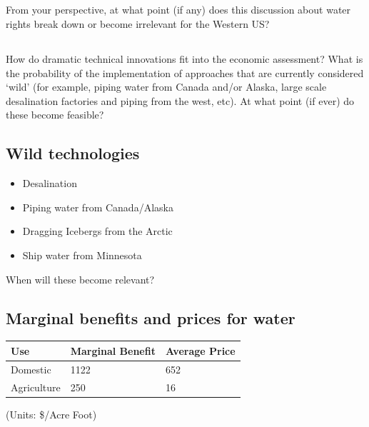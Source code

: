 \documentclass[]{article}
\providecommand{\tightlist}{%
  \setlength{\itemsep}{0pt}\setlength{\parskip}{0pt}}
\begin{document}
\hypertarget{section-38}{%
\subsection{}\label{section-38}}

From your perspective, at what point (if any) does this discussion about
water rights break down or become irrelevant for the Western US?

\hypertarget{section-39}{%
\subsection{}\label{section-39}}

How do dramatic technical innovations fit into the economic assessment?
What is the probability of the implementation of approaches that are
currently considered `wild' (for example, piping water from Canada
and/or Alaska, large scale desalination factories and piping from the
west, etc). At what point (if ever) do these become feasible?

\hypertarget{wild-technologies}{%
\subsection{Wild technologies}\label{wild-technologies}}

\begin{itemize}
\tightlist
\item
  Desalination
\item
  Piping water from Canada/Alaska
\item
  Dragging Icebergs from the Arctic
\item
  Ship water from Minnesota
\end{itemize}

When will these become relevant?

\hypertarget{marginal-benefits-and-prices-for-water}{%
\subsection{Marginal benefits and prices for
water}\label{marginal-benefits-and-prices-for-water}}

\begin{longtable}[]{@{}lll@{}}
\toprule
Use & Marginal Benefit & Average Price\tabularnewline
\midrule
\endhead
Domestic & 1122 & 652\tabularnewline
Agriculture & 250 & 16\tabularnewline
\bottomrule
\end{longtable}

(Units: \$/Acre Foot)
\end{document}
